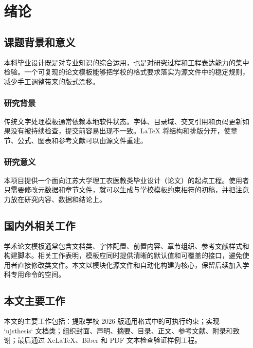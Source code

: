 \chapter{绪论}

\section{课题背景和意义}
本科毕业设计既是对专业知识的综合运用，也是对研究过程和工程表达能力的集中检验。一个可复现的论文模板能够把学校的格式要求落实为源文件中的稳定规则，减少手工调整带来的版式漂移。

\subsection{研究背景}
传统文字处理模板通常依赖本地软件状态。字体、目录域、交叉引用和页码更新如果没有被持续检查，提交前容易出现不一致。LaTeX 将结构和排版分开，使章节、公式、图表和参考文献可以由源文件重建\cite{lamport1994}。

\subsection{研究意义}
本项目提供一个面向江苏大学理工农医教类毕业设计（论文）的起点工程。使用者只需要修改元数据和章节文件，就可以生成与学校模板约束相符的初稿，并把注意力放在研究内容、数据和结论上。

\section{国内外相关工作}
学术论文模板通常包含文档类、字体配置、前置内容、章节组织、参考文献样式和构建脚本。相关工作表明，模板应同时提供清晰的默认值和可覆盖的接口，避免使用者直接修改类文件\cite{mittelbach2004}。本文以模块化源文件和自动化构建为核心，保留后续加入学科专用命令的空间。

\section{本文主要工作}
本文的主要工作包括：提取学校 2026 版通用格式中的可执行约束；实现 `ujsthesis` 文档类；组织封面、声明、摘要、目录、正文、参考文献、附录和致谢；最后通过 XeLaTeX、Biber 和 PDF 文本检查验证样例工程。
